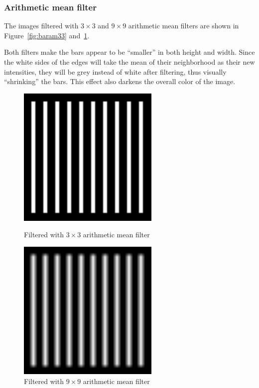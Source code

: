 \documentclass{article}
\begin{document}
\subsubsection{Arithmetic mean filter}

The images filtered with $3 \times 3$ and $9 \times 9$ arithmetic mean filters are shown in Figure~\ref{fig:baram33} and~\ref{fig:baram99}.

Both filters make the bars appear to be ``smaller'' in both height and width. Since the white sides of the edges will take the mean of their neighborhood as their new intensities, they will be grey instead of white after filtering, thus visually ``shrinking'' the bars. This effect also darkens the overall color of the image.

\begin{figure}[H]
	\captionsetup{justification=centering,margin=1cm}
	\begin{minipage}[b]{0.48\linewidth}
		\centering
		\includegraphics[width=192pt]{../result/task1/arithmetic-mean-3-3.png}
		\caption{Filtered with $3 \times 3$ arithmetic mean filter}
		\label{fig:baram33}
	\end{minipage}
	\begin{minipage}[b]{0.48\linewidth}
		\centering
		\includegraphics[width=192pt]{../result/task1/arithmetic-mean-9-9.png}
		\caption{Filtered with $9 \times 9$ arithmetic mean filter}
		\label{fig:baram99}
	\end{minipage}
\end{figure}
\end{document}
